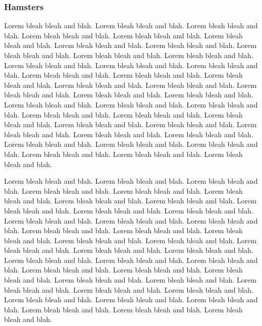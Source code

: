 \documentclass[letterpaper,10pt]{article}
\begin{document}
\subsubsection{Hamsters}
Lorem bleah bleah and blah. Lorem bleah bleah and blah. Lorem bleah
bleah and blah. Lorem bleah bleah and blah. Lorem bleah bleah and
blah. Lorem bleah bleah and blah. Lorem bleah bleah and blah. Lorem
bleah bleah and blah. Lorem bleah bleah and blah. Lorem bleah bleah
and blah. Lorem bleah bleah and blah. Lorem bleah bleah and blah.
Lorem bleah bleah and blah. Lorem bleah bleah and blah. Lorem bleah
bleah and blah. Lorem bleah bleah and blah. Lorem bleah bleah and
blah. Lorem bleah bleah and blah. Lorem bleah bleah and blah. Lorem
bleah bleah and blah. Lorem bleah bleah and blah. Lorem bleah bleah
and blah. Lorem bleah bleah and blah. Lorem bleah bleah and blah.
Lorem bleah bleah and blah. Lorem bleah bleah and blah. Lorem bleah
bleah and blah. Lorem bleah bleah and blah. Lorem bleah bleah and
blah. Lorem bleah bleah and blah. Lorem bleah bleah and blah. Lorem
bleah bleah and blah. Lorem bleah bleah and blah. Lorem bleah bleah
and blah. Lorem bleah bleah and blah. Lorem bleah bleah and blah.
Lorem bleah bleah and blah. Lorem bleah bleah and blah. Lorem bleah
bleah and blah.

Lorem bleah bleah and blah. Lorem bleah bleah and blah. Lorem bleah
bleah and blah. Lorem bleah bleah and blah. Lorem bleah bleah and
blah. Lorem bleah bleah and blah. Lorem bleah bleah and blah. Lorem
bleah bleah and blah. Lorem bleah bleah and blah. Lorem bleah bleah
and blah. Lorem bleah bleah and blah. Lorem bleah bleah and blah.
Lorem bleah bleah and blah. Lorem bleah bleah and blah. Lorem bleah
bleah and blah. Lorem bleah bleah and blah. Lorem bleah bleah and
blah. Lorem bleah bleah and blah. Lorem bleah bleah and blah. Lorem
bleah bleah and blah. Lorem bleah bleah and blah. Lorem bleah bleah
and blah. Lorem bleah bleah and blah. Lorem bleah bleah and blah.
Lorem bleah bleah and blah. Lorem bleah bleah and blah. Lorem bleah
bleah and blah. Lorem bleah bleah and blah. Lorem bleah bleah and
blah. Lorem bleah bleah and blah. Lorem bleah bleah and blah. Lorem
bleah bleah and blah. Lorem bleah bleah and blah. Lorem bleah bleah
and blah. Lorem bleah bleah and blah. Lorem bleah bleah and blah.
Lorem bleah bleah and blah. Lorem bleah bleah and blah. Lorem bleah
bleah and blah.
\end{document}
